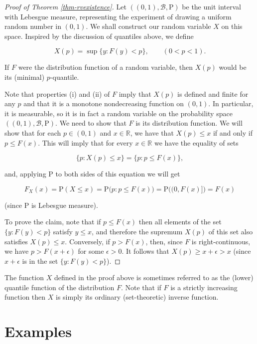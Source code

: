 \documentclass[11pt]{report}
\providecommand{\cal}{\mathcal}
\newcommand{\R}{\mathbb{R}}
\theoremstyle{plain}
\theoremstyle{definition}
\begin{document}
\begin{proof}[Proof of Theorem \ref{thm-rvexistence}]
Let $((0,1), {\cal B}, \mathrm{P})$ be the unit
interval with Lebesgue measure, representing the
experiment of drawing a uniform random number in
$(0,1)$. We shall construct our random variable $X$
on this space. Inspired by the discussion of quantiles
above, we define

\[
X(p) = \sup\{ y : F(y) < p \}, \qquad (0<p<1).
\]

If $F$ were the distribution function of a random
variable, then $X(p)$ would be its (minimal)
$p$-quantile.

Note that properties (i) and (ii) of $F$ imply that
$X(p)$ is defined and finite for any $p$ and that it
is a monotone nondecreasing function on $(0,1)$. In
particular, it is measurable, so it is in fact a
random variable on the probability space
$((0,1), {\cal B}, \mathrm{P})$. We need to show that
$F$ is its distribution function. We will show that
for each $p\in (0,1)$ and $x\in \R$, we have that
$X(p) \le x$ if and only if $p \le F(x)$. This will
imply that for every $x\in \R$ we have the equality
of sets

\[
\{ p : X(p) \le x \} = \{ p : p \le F(x) \},
\]

and, applying $\mathrm{P}$ to both sides of this
equation we will get

\[
F_X(x) = \mathrm{P}(X\le x) = \mathrm{P}\big( p : p \le F(x) \big) = \mathrm{P}\big( (0,F(x)] \big)
= F(x)
\]

(since $\mathrm{P}$ is Lebesgue measure).

To prove the claim, note that if $p \le F(x)$ then
all elements of the set $\{ y : F(y) < p\}$ satisfy
$y\le x$, and therefore the supremum $X(p)$ of this
set also satisfies $X(p) \le x$. Conversely, if
$p > F(x)$, then, since $F$ is right-continuous, we
have $p > F(x+\epsilon)$ for some $\epsilon>0$. It
follows that $X(p)\ge x+\epsilon>x$ (since
$x+\epsilon$ is in the set $\{ y : F(y)<p \}$).
\end{proof}

The function $X$ defined in the proof above is
sometimes referred to as the (lower) quantile function
of the distribution $F$. Note that if $F$ is a
strictly increasing function then $X$ is simply its
ordinary (set-theoretic) inverse function.

\section{Examples}
\end{document}
